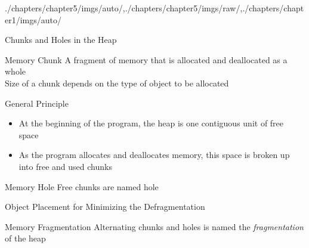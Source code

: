 \begin{graphicspathcontext}{{./chapters/chapter5/imgs/auto/},{./chapters/chapter5/imgs/raw/},{./chapters/chapter1/imgs/auto/}}
\begin{bibunit}[apalike]
\begin{frame}{{Chunks and Holes} in the Heap}
	\begin{definitionblock}{Memory Chunk}
		A fragment of memory that is allocated and deallocated as a whole \\[.2cm]
		Size of a chunk depends on the type of object to be allocated
	\end{definitionblock}
	\vspace{.2cm}
	\begin{block}{General Principle}
		\begin{itemize}
			\item At the beginning of the program, the heap is one contiguous unit of free space
			\item As the program allocates and deallocates memory, this space is broken up into free and used chunks
		\end{itemize}
	\end{block}
	\vspace{.2cm}
	\begin{definitionblock}{Memory Hole}
		Free chunks are named hole
	\end{definitionblock}
\end{frame}

\begin{frame}{Object Placement for Minimizing the Defragmentation}
	\begin{definitionblock}{Memory Fragmentation}
		Alternating chunks and holes is named the \emph{fragmentation} of the heap
	\end{definitionblock}
	\vspace{.2cm}
	\vspace{.2cm}
	\hfill
	\hfill
\end{frame}


\end{bibunit}
\end{graphicspathcontext}
